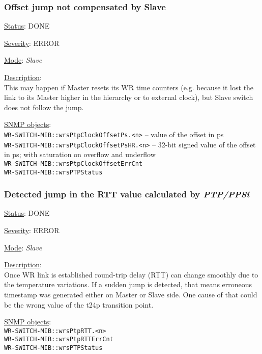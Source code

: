 \subsubsection{\bf Offset jump not compensated by Slave}
		\label{fail:timing:offset_jump}
		\begin{packed_enum}
			\item [] \underline{Status}: DONE
			\item [] \underline{Severity}: ERROR
			\item [] \underline{Mode}: \emph{Slave}
			\item [] \underline{Description}:\\
				This may happen if Master resets its WR time counters (e.g. because it
				lost the link to its Master higher in the hierarchy or to external
				clock), but Slave switch does not follow the jump.
			\item [] \underline{SNMP objects}:\\
				\texttt{WR-SWITCH-MIB::wrsPtpClockOffsetPs.<n>} -- value of the offset in ps\\
				\texttt{WR-SWITCH-MIB::wrsPtpClockOffsetPsHR.<n>} -- 32-bit signed value of the offset in ps; with
				saturation on overflow and underflow\\
				\texttt{WR-SWITCH-MIB::wrsPtpClockOffsetErrCnt}\\
				\texttt{WR-SWITCH-MIB::wrsPTPStatus}
		\end{packed_enum}

\subsubsection{\bf Detected jump in the RTT value calculated by \emph{PTP/PPSi}}
		\label{fail:timing:rtt_jump}
		\begin{packed_enum}
			\item [] \underline{Status}: DONE
			\item [] \underline{Severity}: ERROR
			\item [] \underline{Mode}: \emph{Slave}
			\item [] \underline{Description}:\\
				Once WR link is established round-trip delay (RTT) can change smoothly
				due to the temperature variations. If a sudden jump is detected, that
				means erroneous timestamp was generated either on Master or Slave side.
				One cause of that could be the wrong value of the t24p transition point.
			\item [] \underline{SNMP objects}:\\
				\texttt{WR-SWITCH-MIB::wrsPtpRTT.<n>}\\
				\texttt{WR-SWITCH-MIB::wrsPtpRTTErrCnt}\\
				\texttt{WR-SWITCH-MIB::wrsPTPStatus}
		\end{packed_enum}

